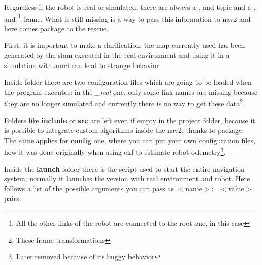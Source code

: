 
Regardless if the robot is real or simulated, there are always a ,  and  topic and a ,  and \footnote{All the other links of the robot are connected to the root one,  in this case} frame. What is still missing is a way to pass this information to \acrshort{nav2} and here comes  package to the rescue.

First, it is important to make a clarification: the map currently used has been generated by the \acrshort{slam} executed in the real environment and using it in a simulation with \acrshort{amcl} can lead to strange behavior.

Inside  folder there are two configuration files which are going to be loaded when the program executes: in the {\it \_real} one, only some link names are missing because they are no longer simulated and currently there is no way to get these data\footnote{These frame transformations}.

Folders like {\bf include} or {\bf src} are left even if empty in the project folder, because it is possible to integrate custom algorithms inside the \acrlong{nav2}, thanks to  package. The same applies for {\bf config} one, where you can put your own configuration files, how it was done originally when using \acrfull{ekf} to estimate robot odemetry\footnote{Later removed because of its buggy behavior}.

Inside the {\bf launch} folder there is the script used to start the entire navigation system; normally it launches the version with real environment and robot. Here follows a list of the possible arguments you can pass as $<$name$>$:=$<$value$>$ pairs: %

\newcommand{\arguments}[2]{{\bf #1}: {\it #2}}

